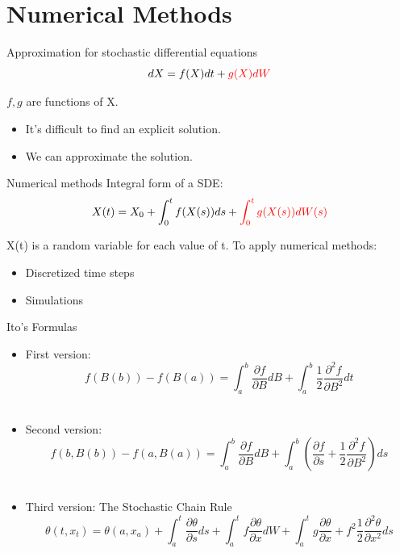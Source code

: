 
\section{Numerical Methods}

\begin{frame}{Approximation for stochastic differential equations}
	\begin{equation*}
	dX=f(X)dt+{\color{red}g(X)dW}
	\end{equation*}
	\begin{center}
	$f,g$ are functions of X.	
	\end{center}
	\begin{itemize}
		\item It's difficult to find an explicit solution.
		\item We can approximate the solution.
	\end{itemize}
\end{frame}

\begin{frame}{Numerical methods}
Integral form of a SDE: 
$$X(t)=X_0+\int_{0}^{t}f(X(s))ds+{\color{red}\int_{0}^{t}g(X(s))dW(s)}$$

X(t) is a random variable for each value of t. To apply numerical methods:
	\begin{itemize}
		\item Discretized time steps	
		\item Simulations
	\end{itemize}
\end{frame}

\begin{frame}{Ito's Formulas}
  	\begin{itemize}
   		\item First version: $$f(B(b))-f(B(a))=\int_{a}^{b}{\frac{\partial f}{\partial B} 				dB}+\int_{a}^{b}{\frac{1}{2} \frac{\partial^2 f}{\partial B^2} dt} $$\\
    		\item Second version: $$f(b,B(b))-f(a,B(a))=\int_{a}^{b}{\frac{\partial f}{\partial B} 			dB}+\int_{a}^{b}{\left(\frac{\partial f}{\partial s}+\frac{1}{2}\frac{\partial^2 f}
    		{\partial B^2}\right) ds}$$\\
    		\item Third version: The Stochastic Chain Rule
    		$$\theta (t,x_t)=\theta(a,x_a)+\int_{a}^{t}\frac{\partial \theta}{\partial s}ds+
    		\int_{a}^{t}f\frac{\partial \theta}{\partial x}dW+
  		\int_{a}^{t}g\frac{\partial \theta}{\partial x}+f^2 \frac{1}{2} \frac{\partial ^2\theta}
  		{\partial x^2}ds$$\\
  	\end{itemize}
\end{frame}


